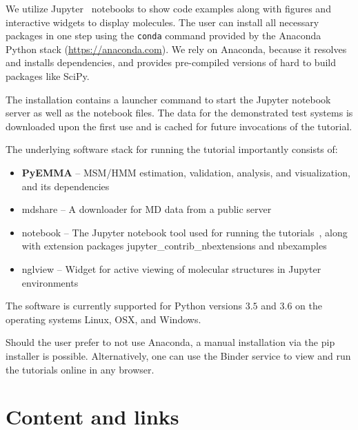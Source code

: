 \documentclass[9pt,tutorial]{livecoms}
\begin{document}
We utilize Jupyter~\cite{jupyter} notebooks to show code examples along with figures and interactive widgets to display molecules.
The user can install all necessary packages in one step using the \texttt{conda} command provided by the Anaconda Python stack (\url{https://anaconda.com}).
We rely on Anaconda, because it resolves and installs dependencies, and provides pre-compiled versions of hard to build packages like SciPy.

The installation contains a launcher command to start the Jupyter notebook server as well as the notebook files.
The data for the demonstrated test systems is downloaded upon the first use and is cached for future invocations of the tutorial.

The underlying software stack for running the tutorial importantly consists of:
\begin{itemize}
\item \textbf{PyEMMA} -- MSM/HMM estimation, validation, analysis, and visualization, and its dependencies~\cite{pyemma}
\item mdshare -- A downloader for MD data from a public server
\item notebook -- The Jupyter notebook tool used for running the tutorials~\cite{jupyter}, along with extension packages jupyter\_contrib\_nbextensions and nbexamples
\item nglview -- Widget for active viewing of molecular structures in Jupyter environments~\cite{nguyen2017nglview}
\end{itemize}

The software is currently supported for Python versions $3.5$ and $3.6$ on the operating systems Linux, OSX, and Windows.

Should the user prefer to not use Anaconda, a manual installation via the pip installer is possible.
Alternatively, one can use the Binder service to view and run the tutorials online in any browser.

\section{Content and links}
\end{document}
